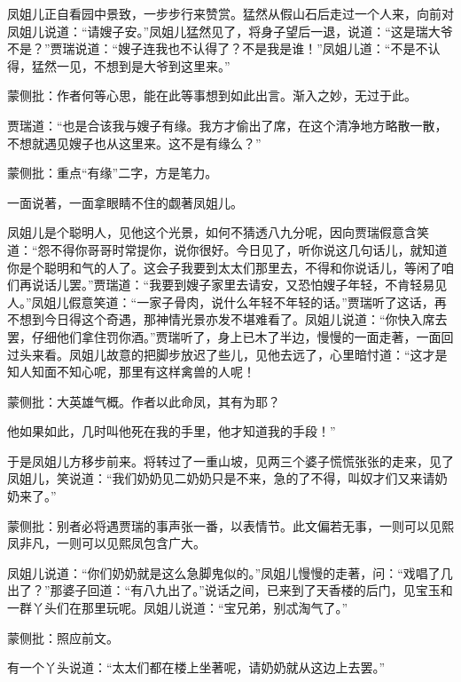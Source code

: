 \begin{parag}
    凤姐儿正自看园中景致，一步步行来赞赏。猛然从假山石后走过一个人来，向前对凤姐儿说道：“请嫂子安。”凤姐儿猛然见了，将身子望后一退，说道：“这是瑞大爷不是？”贾瑞说道：“嫂子连我也不认得了？不是我是谁！”凤姐儿道：“不是不认得，猛然一见，不想到是大爷到这里来。”\begin{note}蒙侧批：作者何等心思，能在此等事想到如此出言。渐入之妙，无过于此。\end{note}贾瑞道：“也是合该我与嫂子有缘。我方才偷出了席，在这个清净地方略散一散，不想就遇见嫂子也从这里来。这不是有缘么？”\begin{note}蒙侧批：重点“有缘”二字，方是笔力。\end{note}一面说著，一面拿眼睛不住的觑著凤姐儿。
\end{parag}


\begin{parag}
    凤姐儿是个聪明人，见他这个光景，如何不猜透八九分呢，因向贾瑞假意含笑道：“怨不得你哥哥时常提你，说你很好。今日见了，听你说这几句话儿，就知道你是个聪明和气的人了。这会子我要到太太们那里去，不得和你说话儿，等闲了咱们再说话儿罢。”贾瑞道：“我要到嫂子家里去请安，又恐怕嫂子年轻，不肯轻易见人。”凤姐儿假意笑道：“一家子骨肉，说什么年轻不年轻的话。”贾瑞听了这话，再不想到今日得这个奇遇，那神情光景亦发不堪难看了。凤姐儿说道：“你快入席去罢，仔细他们拿住罚你酒。”贾瑞听了，身上已木了半边，慢慢的一面走著，一面回过头来看。凤姐儿故意的把脚步放迟了些儿，见他去远了，心里暗忖道：“这才是知人知面不知心呢，那里有这样禽兽的人呢！\begin{note}蒙侧批：大英雄气概。作者以此命凤，其有为耶？\end{note}他如果如此，几时叫他死在我的手里，他才知道我的手段！”
\end{parag}


\begin{parag}
    于是凤姐儿方移步前来。将转过了一重山坡，见两三个婆子慌慌张张的走来，见了凤姐儿，笑说道：“我们奶奶见二奶奶只是不来，急的了不得，叫奴才们又来请奶奶来了。”\begin{note}蒙侧批：别者必将遇贾瑞的事声张一番，以表情节。此文偏若无事，一则可以见熙凤非凡，一则可以见熙凤包含广大。\end{note}凤姐儿说道：“你们奶奶就是这么急脚鬼似的。”凤姐儿慢慢的走著，问：“戏唱了几出了？”那婆子回道：“有八九出了。”说话之间，已来到了天香楼的后门，见宝玉和一群丫头们在那里玩呢。凤姐儿说道：“宝兄弟，别忒淘气了。”\begin{note}蒙侧批：照应前文。\end{note}有一个丫头说道：“太太们都在楼上坐著呢，请奶奶就从这边上去罢。”
\end{parag}


